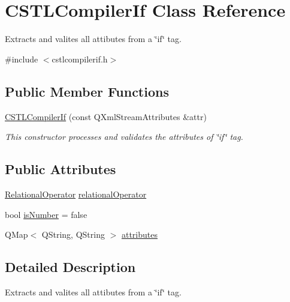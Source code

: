 \hypertarget{class_c_s_t_l_compiler_if}{}\section{C\+S\+T\+L\+Compiler\+If Class Reference}
\label{class_c_s_t_l_compiler_if}


Extracts and valites all attibutes from a \char`\"{}if\char`\"{} tag.  




{\ttfamily \#include $<$cstlcompilerif.\+h$>$}

\subsection*{Public Member Functions}
\begin{DoxyCompactItemize}
\item 
\hyperlink{class_c_s_t_l_compiler_if_a6d9ff3428d392123f5139d8ca65e5322}{C\+S\+T\+L\+Compiler\+If} (const Q\+Xml\+Stream\+Attributes \&attr)
\begin{DoxyCompactList}\small\item\em This constructor processes and validates the attributes of \char`\"{}if\char`\"{} tag. \end{DoxyCompactList}\end{DoxyCompactItemize}
\subsection*{Public Attributes}
\begin{DoxyCompactItemize}
\item 
\hyperlink{cstlcompilerif_8h_ab4e50941dad07890a1fdde098016b6d8}{Relational\+Operator} \hyperlink{class_c_s_t_l_compiler_if_a62b146cf929d1281be7a4d280bff04df}{relational\+Operator}
\item 
bool \hyperlink{class_c_s_t_l_compiler_if_a598f5f0e824ffa6a6b817a362e108363}{is\+Number} = false
\item 
Q\+Map$<$ Q\+String, Q\+String $>$ \hyperlink{class_c_s_t_l_compiler_if_a6bf7af6ef1a5c9c5f0654b6873ffe6d0}{attributes}
\end{DoxyCompactItemize}


\subsection{Detailed Description}
Extracts and valites all attibutes from a \char`\"{}if\char`\"{} tag. 

